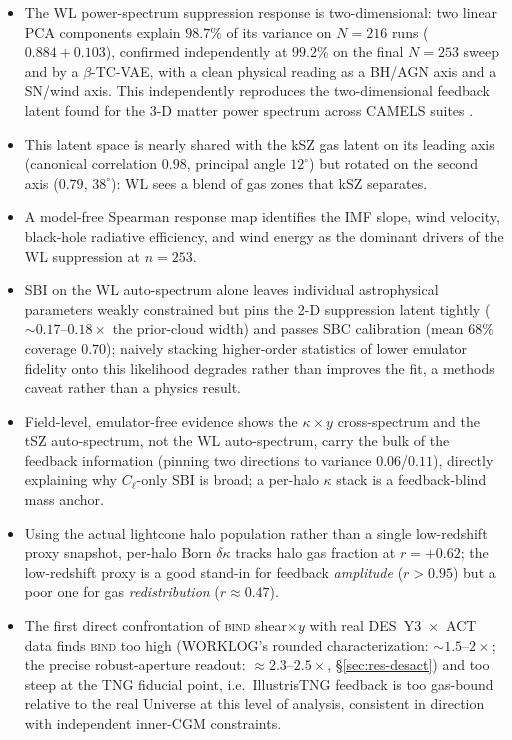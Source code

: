 \documentclass[11pt]{article}
\newcommand{\bind}{\textsc{bind}}
\newcommand{\kappay}{\kappa\times y}
\begin{document}
\begin{itemize}
\item The WL power-spectrum suppression response is two-dimensional: two
linear PCA components explain $98.7\%$ of its variance on $N=216$ runs
($0.884+0.103$), confirmed independently at $99.2\%$ on the final $N=253$
sweep and by a $\beta$-TC-VAE, with a clean physical reading as a
BH/AGN axis and a SN/wind axis. %
This independently reproduces the two-dimensional feedback latent found
for the 3-D matter power spectrum across CAMELS suites
\citep{Lin2026latent}.
\item This latent space is nearly shared with the kSZ gas latent on its
leading axis (canonical correlation $0.98$, principal angle $12^\circ$)
but rotated on the second axis ($0.79$, $38^\circ$): WL sees a blend of
gas zones that kSZ separates. %
\item A model-free Spearman response map identifies the IMF slope, wind
velocity, black-hole radiative efficiency, and wind energy as the
dominant drivers of the WL suppression at $n=253$. %
\item SBI on the WL auto-spectrum alone leaves individual astrophysical
parameters weakly constrained but pins the 2-D suppression latent tightly
($\sim\!0.17$–$0.18\times$ the prior-cloud width) and passes SBC
calibration (mean $68\%$ coverage $0.70$); naively stacking higher-order
statistics of lower emulator fidelity onto this likelihood degrades rather
than improves the fit, a methods caveat rather than a physics result. %
\item Field-level, emulator-free evidence shows the $\kappay$
cross-spectrum and the tSZ auto-spectrum, not the WL auto-spectrum, carry
the bulk of the feedback information (pinning two directions to variance
$0.06$/$0.11$), directly explaining why $C_\ell$-only SBI is broad; a
per-halo $\kappa$ stack is a feedback-blind mass anchor. %
\item Using the actual lightcone halo population rather than a single
low-redshift proxy snapshot, per-halo Born $\delta\kappa$ tracks halo gas
fraction at $r=+0.62$; the low-redshift proxy is a good stand-in for
feedback \emph{amplitude} ($r>0.95$) but a poor one for gas
\emph{redistribution} ($r\approx0.47$). %
\item The first direct confrontation of \bind{} shear$\times y$ with real
DES~Y3~$\times$~ACT data finds \bind{} too high (WORKLOG's rounded
characterization: $\sim\!1.5$–$2\times$; the precise robust-aperture
readout: $\approx\!2.3$–$2.5\times$, \S\ref{sec:res-desact}) and
too steep at the TNG fiducial point, i.e.\ IllustrisTNG feedback is too
gas-bound relative to the real Universe at this level of analysis,
consistent in direction with independent inner-CGM constraints. %
\end{itemize}
\end{document}
